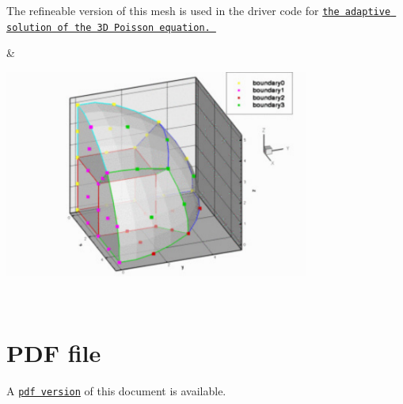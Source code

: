 \begin{center}
\begin{longtabu}
\begin{DoxyItemize}
\item The refineable version of this mesh is used in the driver code for \href{../../../poisson/eighth_sphere_poisson/html/index.html}{\tt the adaptive solution of the 3D Poisson equation. }
\end{DoxyItemize}& 
\begin{DoxyImageNoCaption}
  \mbox{\includegraphics[width=0.75\textwidth]{eighth_sphere_mesh}}
\end{DoxyImageNoCaption}
   \\
\end{longtabu}
\end{center} 



 

 \hypertarget{index_pdf}{}\section{P\+D\+F file}\label{index_pdf}
A \href{../latex/refman.pdf}{\tt pdf version} of this document is available. 
